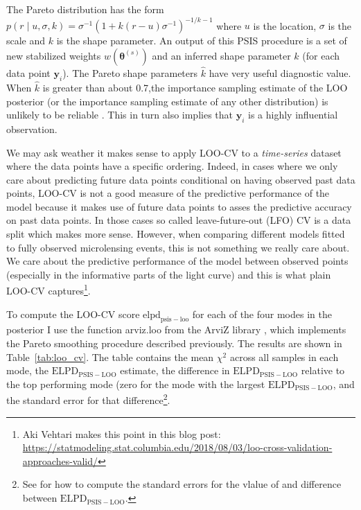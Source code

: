 \documentclass[12pt,dvipsnames]{report}
\newcommand{\ssf}[1]{\textsf{#1}}
\renewcommand{\vec}[1]{\boldsymbol{\mathbf{#1}}}
\begin{document}
The Pareto distribution has 
the form $p(r \mid u, \sigma, k)=\sigma^{-1}\left(1+k(r-u) \sigma^{-1}\right)^{-1 / k-1}$
where $u$ is the location, $\sigma$ is the scale and $k$ is the shape parameter.
An output of this PSIS  procedure \citep[described in][]{2015arXiv150702646V,vehtari2017} 
is a set of new stabilized weights $w(\vec\theta^{(s)})$ and an inferred shape parameter $\hat k$ 
(for each data point $\vec y_i$). The Pareto shape parameters $\hat k$ have very useful 
diagnostic value. When $\hat k$ is greater than about 0.7,the importance sampling estimate of 
the LOO posterior (or the importance sampling estimate of any other distribution) is 
unlikely to be reliable \citep{2015arXiv150702646V}. This in turn also implies that 
$\vec y_i$ is a highly influential observation. 

We may ask weather it makes sense to apply LOO-CV to a \emph{time-series} dataset where 
the data points have a specific ordering. Indeed, in cases where we only care about 
predicting future data points conditional on having observed past data points, 
LOO-CV is not a good measure of the predictive performance of the model because it 
makes use of future data points to asses the predictive accuracy on past data points. 
In those cases so called leave-future-out (LFO) CV \citep{arXiv:1902.06281}
 is a data split which makes more sense.
However, when comparing different models fitted to fully observed microlensing events, 
this is not something we really care about. We care about the predictive performance 
of the model between observed points  (especially in the informative 
parts of the light curve) and this is what plain LOO-CV 
captures\footnote{Aki Vehtari makes this point in this blog post: 
\url{https://statmodeling.stat.columbia.edu/2018/08/03/loo-cross-validation-approaches-valid/}}.

 To compute the LOO-CV score $\mathrm{elpd}_\mathrm{psis-loo}$ for each of the four modes 
 in the posterior I use the function \ssf{arviz.loo} from the \ssf{ArviZ} library 
 \citep{arviz_2019}, which implements 
 the Pareto smoothing procedure described previously.  The results are shown in 
Table~\ref{tab:loo_cv}. The table contains the mean $\chi^2$ across all samples 
in each mode, the $\mathrm{ELPD}_\mathrm{PSIS-LOO}$ estimate, the difference 
in $\mathrm{ELPD}_\mathrm{PSIS-LOO}$ relative to the top performing mode (zero
for the mode with the largest $\mathrm{ELPD}_\mathrm{PSIS-LOO}$, and the 
standard error for that difference\footnote{See \citet{vehtari2017} for how to compute
the standard errors for the vlalue of and difference between 
$\mathrm{ELPD}_\mathrm{PSIS-LOO}$.}. 
\end{document}
